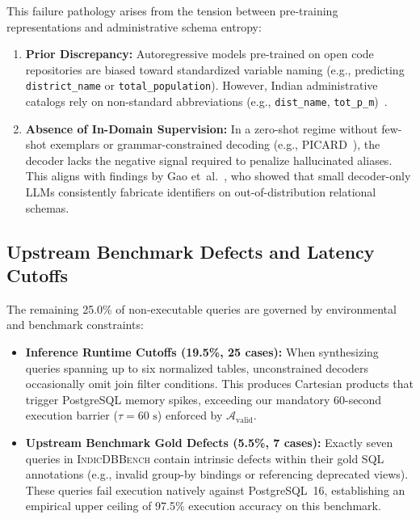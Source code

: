 \documentclass[conference]{IEEEtran}
\begin{document}
This failure pathology arises from the tension between pre-training representations and administrative schema entropy:
\begin{enumerate}
    \item \textbf{Prior Discrepancy:} Autoregressive models pre-trained on open code repositories are biased toward standardized variable naming (e.g., predicting \texttt{district\_name} or \texttt{total\_population}). However, Indian administrative catalogs rely on non-standard abbreviations (e.g., \texttt{dist\_name}, \texttt{tot\_p\_m})~\cite{dawar2026indicdbbench}.
    \item \textbf{Absence of In-Domain Supervision:} In a zero-shot regime without few-shot exemplars or grammar-constrained decoding (e.g., PICARD~\cite{scholak2021picard}), the decoder lacks the negative signal required to penalize hallucinated aliases. This aligns with findings by Gao et~al.~\cite{gao2023gpt4}, who showed that small decoder-only LLMs consistently fabricate identifiers on out-of-distribution relational schemas.
\end{enumerate}

\subsection{Upstream Benchmark Defects and Latency Cutoffs}
The remaining 25.0\% of non-executable queries are governed by environmental and benchmark constraints:
\begin{itemize}
    \item \textbf{Inference Runtime Cutoffs (19.5\%, 25 cases):} When synthesizing queries spanning up to six normalized tables, unconstrained decoders occasionally omit join filter conditions. This produces Cartesian products that trigger PostgreSQL memory spikes, exceeding our mandatory 60-second execution barrier ($\tau = 60\text{ s}$) enforced by $\mathcal{A}_{\text{valid}}$.
    \item \textbf{Upstream Benchmark Gold Defects (5.5\%, 7 cases):} Exactly seven queries in \textsc{IndicDBBench} contain intrinsic defects within their gold SQL annotations (e.g., invalid group-by bindings or referencing deprecated views). These queries fail execution natively against PostgreSQL~16, establishing an empirical upper ceiling of 97.5\% execution accuracy on this benchmark.
\end{itemize}
\end{document}
